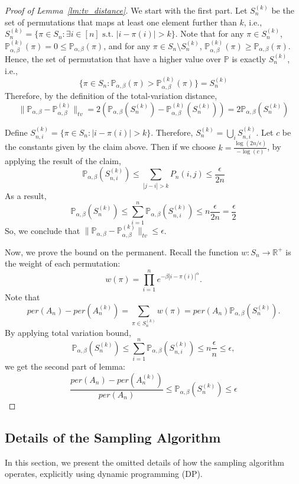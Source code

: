 \documentclass{article}
\renewcommand{\P}{\mathbb{P}}
\begin{document}
\begin{proof}[Proof of Lemma~\ref{lm:tv_distance}]
We start with the first part.
Let $S_n^{(k)}$ be the set of permutations that maps at least 
one element further than $k$, i.e., $S^{(k)}_n = \{\pi\in S_n: \exists i\in[n]  \text{  s.t.  } |i-\pi(i)|> k\}$.  
    Note that for any $\pi \in S_{n}^{(k)}$, $ \P^{(k)}_{\alpha,\beta}(\pi) = 0\leq \P_{\alpha,\beta}(\pi)$, and for any $\pi\in S_n \setminus S_n^{(k)}$, $\P^{(k)}_{\alpha,\beta}(\pi)\geq \P_{\alpha,\beta}(\pi)$. Hence, the set of permutation that have a higher value over $\P$ is exactly $S_n^{(k)}$, i.e.,
    $$\{\pi\in S_n: \P_{\alpha,\beta}(\pi)>\P^{(k)}_{\alpha,\beta}(\pi)\}=S_n^{(k)}$$
    Therefore,
    by the definition of the total-variation distance,
    $$ \|\P_{\alpha,\beta} - \P^{(k)}_{\alpha,\beta}\|_{tv} = 2(\P_{\alpha,\beta}(S^{(k)}_n) - \P^{(k)}_{\alpha,\beta}(S^{(k)}_n)) = 2\P_{\alpha,\beta}(S^{(k)}_n) $$
    
    
    Define $S^{(k)}_{n,i} = \{\pi\in S_n: |i-\pi(i)|>k\}$. Therefore, $S^{(k)}_n = \bigcup_{i}S^{(k)}_{n,i}$. Let $c$ be the constants given by the claim above. Then if we choose $k=\frac{\log(2n/\epsilon)}{-\log(c)}$, by applying the result of the claim,
    $$\P_{\alpha,\beta}(S^{(k)}_{n,i}) \leq  \sum_{|j-i|>k} P_n(i,j)\leq \frac{\epsilon}{2n}$$
    As a result,
    $$\P_{\alpha,\beta}(S_n^{(k)})\leq \sum_{i=1}^n \P_{\alpha,\beta}(S^{(k)}_{n,i}) \leq n\frac{\epsilon}{2n}=\frac{\epsilon}{2}$$
    So, we conclude that $ \|\P_{\alpha,\beta} - \P^{(k)}_{\alpha,\beta}\|_{tv}\leq \epsilon$.

Now, we prove the bound on the permanent. 
Recall the function $w:S_n\rightarrow \mathbb{R^+}$ is the weight of each permutation:
    $$w(\pi) = \prod_{i=1}^n e^{-\beta|i-\pi(i)|^\alpha}.$$   Note that
    $$per(A_n) - per(A^{(k)}_n) = \sum_{\pi\in S^{(k)}_{n} } w(\pi) =per(A_n) \P_{\alpha,\beta}(S_n^{(k)}).$$
By applying total variation bound,
    $$\P_{\alpha,\beta}(S_n^{(k)})\leq \sum_{i=1}^n \P_{\alpha,\beta}(S^{(k)}_{n,i}) \leq n \frac{\epsilon}{n}\leq \epsilon,$$
    we get the second part of lemma:
    $$\frac{per(A_n) - per(A^{(k)}_n)}{per(A_n)} \leq \P_{\alpha,\beta}(S_n^{(k)})\leq \epsilon $$
\end{proof}

\subsection{Details of the Sampling Algorithm}\label{sec:dp construct}
In this section, we present the omitted details of how the sampling algorithm operates, explicitly using dynamic programming (DP).
\end{document}
